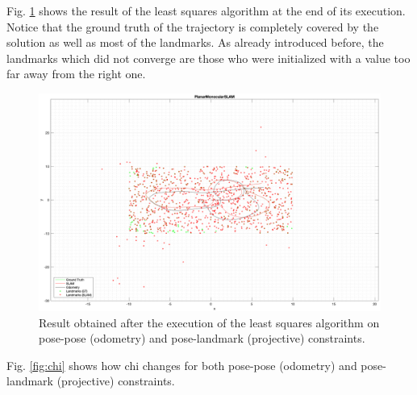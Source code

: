 \documentclass[11pt]{extarticle}
\begin{document}
Fig. \ref{fig:slam-ls} shows the result of the least squares algorithm at
the end of its execution. Notice that the ground truth of the trajectory is
completely covered by the solution as well as most of the landmarks. As
already introduced before, the landmarks which did not converge are those who
were initialized with a value too far away from the right one.
\begin{figure}
    \centering
    \includegraphics[width=\textwidth]{images/slam-ls.png}
    \caption{Result obtained after the execution of the least squares
        algorithm on pose-pose (odometry) and pose-landmark (projective)
        constraints.}
    \label{fig:slam-ls}
\end{figure}

Fig. \ref{fig:chi} shows how chi changes for both pose-pose (odometry) and
pose-landmark (projective) constraints.
\end{document}
